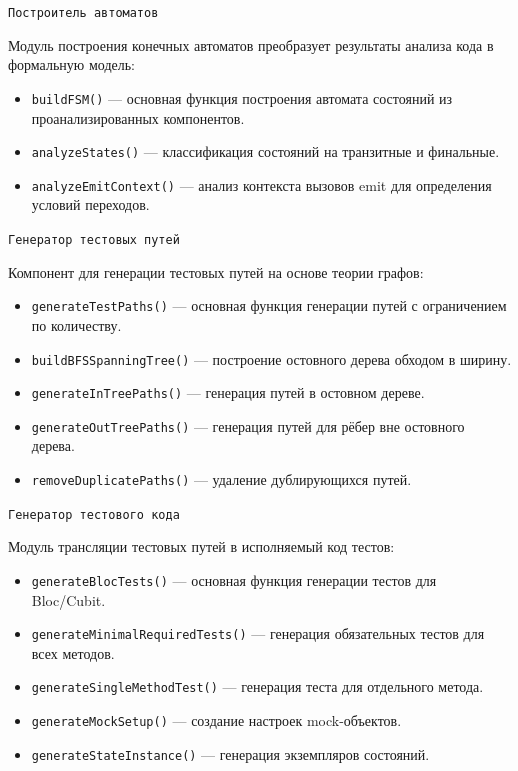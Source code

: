 \documentclass[14pt, russian]{scrartcl}
\begin{document}
\texttt{Построитель автоматов}

Модуль построения конечных автоматов преобразует результаты анализа кода в формальную модель:

\begin{itemize}
    \item \texttt{buildFSM()} — основная функция построения автомата состояний из проанализированных компонентов.
    \item \texttt{analyzeStates()} — классификация состояний на транзитные и финальные.
    \item \texttt{analyzeEmitContext()} — анализ контекста вызовов emit для определения условий переходов.
\end{itemize}

\texttt{Генератор тестовых путей}

Компонент для генерации тестовых путей на основе теории графов:

\begin{itemize}
    \item \texttt{generateTestPaths()} — основная функция генерации путей с ограничением по количеству.
    \item \texttt{buildBFSSpanningTree()} — построение остовного дерева обходом в ширину.
    \item \texttt{generateInTreePaths()} — генерация путей в остовном дереве.
    \item \texttt{generateOutTreePaths()} — генерация путей для рёбер вне остовного дерева.
    \item \texttt{removeDuplicatePaths()} — удаление дублирующихся путей.
\end{itemize}

\texttt{Генератор тестового кода}

Модуль трансляции тестовых путей в исполняемый код тестов:

\begin{itemize}
    \item \texttt{generateBlocTests()} — основная функция генерации тестов для Bloc/Cubit.
    \item \texttt{generateMinimalRequiredTests()} — генерация обязательных тестов для всех методов.
    \item \texttt{generateSingleMethodTest()} — генерация теста для отдельного метода.
    \item \texttt{generateMockSetup()} — создание настроек mock-объектов.
    \item \texttt{generateStateInstance()} — генерация экземпляров состояний.
\end{itemize}
\end{document}
